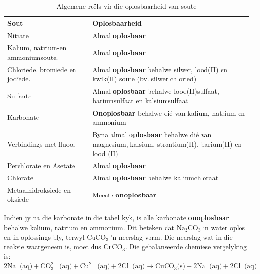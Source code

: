           \begin{table}[H]
        \begin{center}
      \label{m38719*uid69}
    \noindent
      \begin{tabular}{|l|p{8cm}|}\hline
                \textbf{Sout}
               &
                \textbf{Oplosbaarheid} \\ \hline
        Nitrate &
        Almal \textbf{oplosbaar} \\ \hline
        Kalium, natrium-en ammoniumsoute. &
        Almal \textbf{oplosbaar} \\ \hline
        Chloriede, bromiede en jodiede. &
        Almal \textbf{oplosbaar} behalwe silwer, lood(II) en kwik(II) soute (bv. silwer chloried)  \\ \hline
        Sulfaate &
        Almal \textbf{oplosbaar} behalwe lood(II)sulfaat, bariumsulfaat en kalsiumsulfaat \\ \hline
        Karbonate &
        \textbf{Onoplosbaar} behalwe dié van kalium, natrium en ammonium \\ \hline
        Verbindings met fluoor &
        Byna almal \textbf{oplosbaar} behalwe dié van magnesium, kalsium, strontium(II), barium(II) en lood (II) \\ \hline
        Perchlorate en Asetate &
        Almal \textbf{oplosbaar} \\ \hline
        Chlorate &
        Almal \textbf{oplosbaar} behalwe kaliumchloraat \\ \hline
        Metaalhidroksiede en oksiede &
        Meeste \textbf{onoplosbaar} \\ \hline
    \end{tabular}
      \end{center}
    \caption{Algemene re\"{e}ls vir die oplosbaarheid van soute}
\label{tab:solubility}
\end{table}
Indien jy na die karbonate in die tabel kyk, is alle karbonate \textbf{onoplosbaar} behalwe kalium, natrium en ammonium. Dit beteken dat $\text{Na}_{2}\text{CO}_3$ in water oplos en in oplossings bly, terwyl $\text{CuCO}_3$   'n neerslag vorm. Die neerslag wat in die reaksie waargeneem is, moet dus $\text{CuCO}_3$. Die gebalanseerde chemiese vergelyking is:\\
$2\text{Na}^{+} \text{(aq)} + \text{CO}_{3}^{2-} \text{(aq)} + \text{Cu}^{2+} \text{(aq)} + 2\text{Cl}^{-} \text{(aq)} \to \text{CuCO}_{3} \text{(s)} +  2\text{Na}^{+} \text{(aq)} + 2\text{Cl}^{-} \text{(aq)}$ \\
